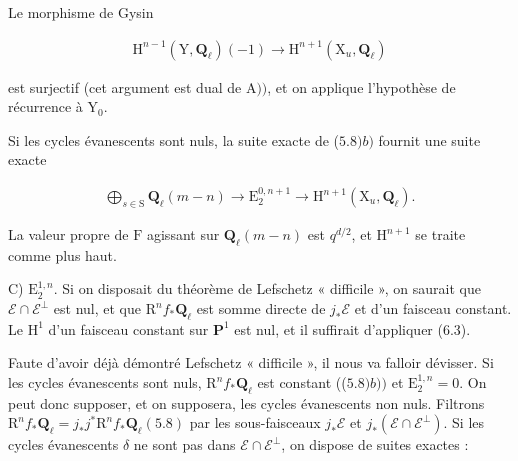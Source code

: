 \documentclass[10pt,leqno]{article}
\begin{document}
\begingroup\setlength{\parskip}{.20em}\setlength{\abovedisplayskip}{4pt}\setlength{\belowdisplayskip}{4pt}\setlength{\abovedisplayshortskip}{2pt}\setlength{\belowdisplayshortskip}{2pt}

\label{physical-29}\setcounter{page}{300}

\noindent Le morphisme de Gysin\par

\begin{equation*}\begin{gathered}\mathrm{H}^{n- 1}(\mathrm{Y},\mathbf{Q}_{\ell })(- 1) \longrightarrow  \mathrm{H}^{n+1}(\mathrm{X}_{u},\mathbf{Q}_{\ell })\end{gathered}\end{equation*}

\noindent est surjectif (cet argument est dual de \(\mathrm{A}))\), et on applique l’hypothèse de récurrence à \(\mathrm{Y}_{0}\).\par

\noindent Si les cycles évanescents sont nuls, la suite exacte de (\(5.8) b)\) fournit une suite exacte\par

\begin{equation*}\begin{gathered}\bigoplus\limits_{s\in \mathrm{S}}\mathbf{Q}_{\ell }(m- n) \longrightarrow  \mathrm{E}_{2}^{0,n+1} \longrightarrow  \mathrm{H}^{n+1}(\mathrm{X}_{u},\mathbf{Q}_{\ell }).\end{gathered}\end{equation*}

\noindent La valeur propre de \(\mathrm{F}\) agissant sur \(\mathbf{Q}_{\ell }(m- n)\) est \(q^{d/2}\), et \(\mathrm{H}^{n+1}\) se traite comme plus haut.\par

\noindent C) \(\mathrm{E}_{2}^{1,n}\). Si on disposait du théorème de Lefschetz « difficile », on saurait que \(\mathcal{E} \cap \mathcal{E} ^{\perp }\) est nul, et que \(\mathrm{R}^{n} f_{*}\mathbf{Q}_{\ell }\) est somme directe de \(j_{*}\mathcal{E} \) et d’un faisceau constant. Le \(\mathrm{H}^{1}\) d’un faisceau constant sur \(\mathbf{P}^{1}\) est nul, et il suffirait d’appliquer (6.3).\par

\noindent Faute d’avoir déjà démontré Lefschetz « difficile », il nous va falloir dévisser. Si les cycles évanescents sont nuls, \(\mathrm{R}^{n} f_{*}\mathbf{Q}_{\ell }\) est constant ((\(5.8) b))\) et \(\mathrm{E}_{2}^{1,n}=0\). On peut donc supposer, et on supposera, les cycles évanescents non nuls. Filtrons \(\mathrm{R}^{n} f_{*}\mathbf{Q}_{\ell }=j_{*}j^{*}\mathrm{R}^{n} f_{*}\mathbf{Q}_{\ell } (5.8)\) par les sous-faisceaux \(j_{*}\mathcal{E} \) et \(j_{*}(\mathcal{E} \cap \mathcal{E} ^{\perp })\). Si les cycles évanescents \(\delta \) ne sont pas dans \(\mathcal{E} \cap \mathcal{E} ^{\perp }\), on dispose de suites exactes :\par
\end{document}
